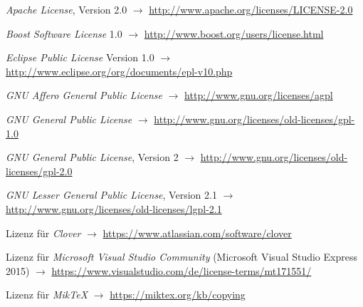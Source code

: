 \documentclass[english,ngerman,parskip=half,headsepline,footsepline]{scrreprt}
\begin{document}

	\ihead{\textnormal{\textsf{\textbf{\listfigurename}}}}
    \begin{minipage}{\textwidth-10.95pt}
    	\listoffigures
    \end{minipage}\par
	\thispagestyle{scrheadings}


   	\begin{flushleft}
		\begin{thebibliography}{12}
			\ihead{\textnormal{\textsf{\textbf{\bibname}}}}
			\thispagestyle{scrheadings}

			\emph{Apache License}, Version 2.0 $\rightarrow$ \url{http://www.apache.org/licenses/LICENSE-2.0}

			\emph{Boost Software License} 1.0 $\rightarrow$ \url{http://www.boost.org/users/license.html}

			\emph{Eclipse Public License} Version 1.0 $\rightarrow$ \url{http://www.eclipse.org/org/documents/epl-v10.php}

			\emph{GNU Affero General Public License} $\rightarrow$ \url{http://www.gnu.org/licenses/agpl}

			\emph{GNU General Public License} $\rightarrow$ \url{http://www.gnu.org/licenses/old-licenses/gpl-1.0}

			\emph{GNU General Public License}, Version 2 $\rightarrow$ \url{http://www.gnu.org/licenses/old-licenses/gpl-2.0}

			\emph{GNU Lesser General Public License}, Version 2.1 $\rightarrow$ \url{http://www.gnu.org/licenses/old-licenses/lgpl-2.1}

			Lizenz für \emph{Clover} $\rightarrow$ \url{https://www.atlassian.com/software/clover}

			Lizenz für \emph{Microsoft Visual Studio Community} (Microsoft Visual Studio Express 2015) $\rightarrow$ \url{https://www.visualstudio.com/de/license-terms/mt171551/}

			Lizenz für \emph{MikTeX} $\rightarrow$ \url{https://miktex.org/kb/copying}


\end{thebibliography}
\end{flushleft}
\end{document}
